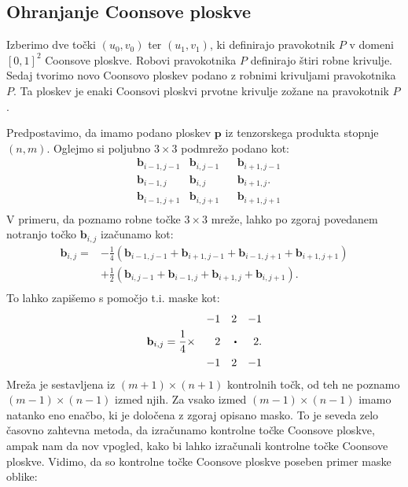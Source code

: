 \documentclass[a4paper,12pt]{article}
\begin{document}
\subsection{Ohranjanje Coonsove ploskve}

Izberimo dve točki $(u_0, v_0)$ ter $(u_1,v_1)$, ki definirajo pravokotnik $P$
v domeni $[0,1]^2$ Coonsove ploskve. 
Robovi pravokotnika $P$ definirajo štiri robne krivulje.
Sedaj tvorimo novo Coonsovo ploskev podano z robnimi krivuljami pravokotnika $P$.
Ta ploskev je enaki Coonsovi ploskvi prvotne krivulje zožane na pravokotnik $P$.

Predpostavimo, da imamo podano ploskev $\mathbf{p}$ iz tenzorskega produkta stopnje $(n,m)$.
Oglejmo si poljubno $3\times 3$ podmrežo podano kot:
\begin{align*}
      &\mathbf{b}_{i-1,j-1} &\mathbf{b}_{i,j-1}& &\mathbf{b}_{i+1,j-1} \\
      &\mathbf{b}_{i-1,j} &\mathbf{b}_{i,j}& &\mathbf{b}_{i+1,j}. \\
      &\mathbf{b}_{i-1,j+1} &\mathbf{b}_{i,j+1}& &\mathbf{b}_{i+1,j+1} \\ 
\end{align*}
V primeru, da poznamo robne točke $3\times 3$ mreže, lahko po zgoraj povedanem
notranjo točko $\mathbf{b}_{i,j}$ izačunamo kot:
\begin{align*}
   \mathbf{b}_{i,j} =&-\frac{1}{4}(\mathbf{b}_{i-1,j-1}+\mathbf{b}_{i+1,j-1}+\mathbf{b}_{i-1,j+1}+\mathbf{b}_{i+1,j+1}) \\
   &+\frac{1}{2}(\mathbf{b}_{i,j-1}+\mathbf{b}_{i-1,j}+\mathbf{b}_{i+1,j}+\mathbf{b}_{i,j+1}).\\
\end{align*}
To lahko zapišemo s pomočjo t.i. maske kot:
\begin{align*}
                                        & &-1  & &2 & &-1 \\
   &\mathbf{b}_{i,j}=\frac{1}{4} \times & 2 & & \sbullet & & 2 .\\
                                        & &-1 & &2 & &-1 \\ 
\end{align*}
Mreža je sestavljena iz $(m+1)\times(n+1)$ kontrolnih točk, od teh ne poznamo 
$(m-1)\times(n-1)$ izmed njih. 
Za vsako izmed $(m-1)\times(n-1)$ imamo natanko eno enačbo, ki je določena z zgoraj opisano masko.
To je seveda zelo časovno zahtevna metoda, da izračunamo kontrolne točke Coonsove ploskve,
ampak nam da nov vpogled, kako bi lahko izračunali kontrolne točke Coonsove ploskve.
Vidimo, da so kontrolne točke Coonsove ploskve poseben primer maske oblike:
\end{document}
